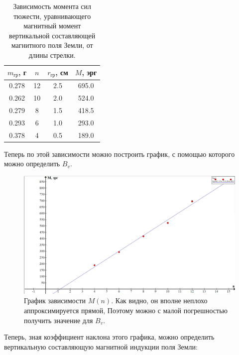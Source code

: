 \documentclass[a4paper, 14pt]{extarticle}%
\newcommand\ECaption[1]{%
     \captionsetup{font=footnotesize}%
     \caption{#1}}
\newcommand\ECaption[1]{%
     \captionsetup{font=footnotesize}%
     \caption{#1}}
\begin{document}
\begin{table}[h]
\begin{center}
\begin{tabular}{|c|c|c|c|}
\hline
\rowcolor[HTML]{9698ED} 
$m_{\text{гр}}$, г & $n$ & $r_{\text{гр}}$, см & $M$, эрг     \\ \hline
0.278           & 12  & 2.5               & 695.0  \\ \hline
\rowcolor[HTML]{9698ED} 
0.262           & 10  & 2.0             & 524.0 \\ \hline
0.279           & 8   & 1.5             & 418.5 \\ \hline
\rowcolor[HTML]{9698ED} 
0.293           & 6   & 1.0             & 293.0 \\ \hline
0.378           & 4   & 0.5             & 189.0   \\ \hline
\end{tabular}
\ECaption{Зависимость момента сил тюжести, уравнивающего магнитный момент вертикальной составляющей магнитного поля Земли, от длины стрелки. }
\end{center}
\end{table}

Теперь по этой зависимости можно построить график, с помощью которого можно определить $B_v$.

\begin{figure}[h!]
\begin{center}
\includegraphics[width=1\textwidth]{lab1232.png}
\end{center}
\ECaption{График зависимости $M(n)$. Как видно, он вполне неплохо аппроксимируется прямой, Поэтому можно с малой погрешностью получить значение для  $B_v$. }
\end{figure}

Теперь, зная коэффициент наклона этого графика, можно определить вертикальную составляющую магнитной индукции поля Земли:
\end{document}
